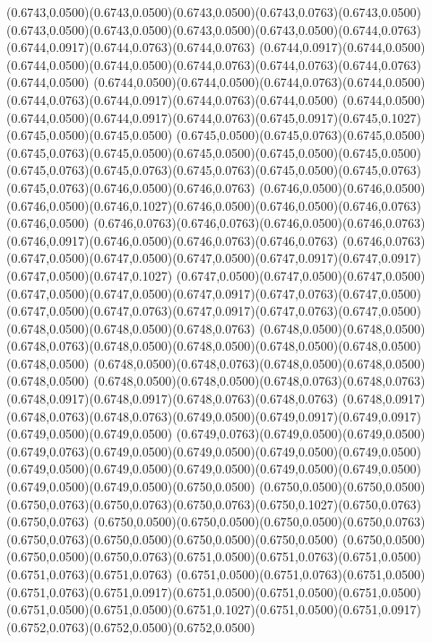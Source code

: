 (0.6743,0.0500)(0.6743,0.0500)(0.6743,0.0500)(0.6743,0.0763)(0.6743,0.0500)
\PST@Solid(0.6743,0.0500)(0.6743,0.0500)(0.6743,0.0500)(0.6743,0.0500)(0.6744,0.0763)(0.6744,0.0917)(0.6744,0.0763)(0.6744,0.0763)
(0.6744,0.0917)(0.6744,0.0500)(0.6744,0.0500)(0.6744,0.0500)(0.6744,0.0763)(0.6744,0.0763)(0.6744,0.0763)(0.6744,0.0500)
(0.6744,0.0500)(0.6744,0.0500)(0.6744,0.0763)(0.6744,0.0500)(0.6744,0.0763)(0.6744,0.0917)(0.6744,0.0763)(0.6744,0.0500)
(0.6744,0.0500)(0.6744,0.0500)(0.6744,0.0917)(0.6744,0.0763)(0.6745,0.0917)(0.6745,0.1027)(0.6745,0.0500)(0.6745,0.0500)
(0.6745,0.0500)(0.6745,0.0763)(0.6745,0.0500)(0.6745,0.0763)(0.6745,0.0500)(0.6745,0.0500)(0.6745,0.0500)(0.6745,0.0500)
(0.6745,0.0763)(0.6745,0.0763)(0.6745,0.0763)(0.6745,0.0500)(0.6745,0.0763)(0.6745,0.0763)(0.6746,0.0500)(0.6746,0.0763)
(0.6746,0.0500)(0.6746,0.0500)(0.6746,0.0500)(0.6746,0.1027)(0.6746,0.0500)(0.6746,0.0500)(0.6746,0.0763)(0.6746,0.0500)
(0.6746,0.0763)(0.6746,0.0763)(0.6746,0.0500)(0.6746,0.0763)(0.6746,0.0917)(0.6746,0.0500)(0.6746,0.0763)(0.6746,0.0763)
(0.6746,0.0763)(0.6747,0.0500)(0.6747,0.0500)(0.6747,0.0500)(0.6747,0.0917)(0.6747,0.0917)(0.6747,0.0500)(0.6747,0.1027)
(0.6747,0.0500)(0.6747,0.0500)(0.6747,0.0500)(0.6747,0.0500)(0.6747,0.0500)(0.6747,0.0917)(0.6747,0.0763)(0.6747,0.0500)
(0.6747,0.0500)(0.6747,0.0763)(0.6747,0.0917)(0.6747,0.0763)(0.6747,0.0500)(0.6748,0.0500)(0.6748,0.0500)(0.6748,0.0763)
(0.6748,0.0500)(0.6748,0.0500)(0.6748,0.0763)(0.6748,0.0500)(0.6748,0.0500)(0.6748,0.0500)(0.6748,0.0500)(0.6748,0.0500)
(0.6748,0.0500)(0.6748,0.0763)(0.6748,0.0500)(0.6748,0.0500)(0.6748,0.0500)
\PST@Solid(0.6748,0.0500)(0.6748,0.0500)(0.6748,0.0763)(0.6748,0.0763)(0.6748,0.0917)(0.6748,0.0917)(0.6748,0.0763)(0.6748,0.0763)
(0.6748,0.0917)(0.6748,0.0763)(0.6748,0.0763)(0.6749,0.0500)(0.6749,0.0917)(0.6749,0.0917)(0.6749,0.0500)(0.6749,0.0500)
(0.6749,0.0763)(0.6749,0.0500)(0.6749,0.0500)(0.6749,0.0763)(0.6749,0.0500)(0.6749,0.0500)(0.6749,0.0500)(0.6749,0.0500)
(0.6749,0.0500)(0.6749,0.0500)(0.6749,0.0500)(0.6749,0.0500)(0.6749,0.0500)(0.6749,0.0500)(0.6749,0.0500)(0.6750,0.0500)
(0.6750,0.0500)(0.6750,0.0500)(0.6750,0.0763)(0.6750,0.0763)(0.6750,0.0763)(0.6750,0.1027)(0.6750,0.0763)(0.6750,0.0763)
(0.6750,0.0500)(0.6750,0.0500)(0.6750,0.0500)(0.6750,0.0763)(0.6750,0.0763)(0.6750,0.0500)(0.6750,0.0500)(0.6750,0.0500)
(0.6750,0.0500)(0.6750,0.0500)(0.6750,0.0763)(0.6751,0.0500)(0.6751,0.0763)(0.6751,0.0500)(0.6751,0.0763)(0.6751,0.0763)
(0.6751,0.0500)(0.6751,0.0763)(0.6751,0.0500)(0.6751,0.0763)(0.6751,0.0917)(0.6751,0.0500)(0.6751,0.0500)(0.6751,0.0500)
(0.6751,0.0500)(0.6751,0.0500)(0.6751,0.1027)(0.6751,0.0500)(0.6751,0.0917)(0.6752,0.0763)(0.6752,0.0500)(0.6752,0.0500)
